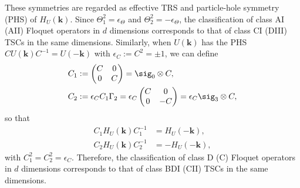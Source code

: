 \documentclass[
floatfix,
pra,
twocolumn,
reprint,
amsmath,amssymb,
aps,
footnote,
]{revtex4}
\begin{document}
These symmetries are regarded as effective TRS and particle-hole symmetry (PHS) of $H_U(\bm{k})$. Since $\Theta_1^2=\epsilon_\Theta$ and $\Theta_2^2=-\epsilon_\Theta$, the classification of class AI (AII) Floquet operators in $d$ dimensions corresponds to that of class CI (DIII) TSCs in the same dimensions. Similarly, when $U(\bm{k})$ has the PHS $CU(\bm{k})C^{-1}=U(-\bm{k})$ with $\epsilon_C:=C^2=\pm 1$, we can define
\begin{align}
C_1 &:=
\begin{pmatrix}
C & 0\\
0 & C
\end{pmatrix}
 = \sig_0 \otimes C
, \\
C_2 &:= \epsilon_C C_1\Gamma_2=\epsilon_C
\begin{pmatrix}
C & 0\\
0 & -C
\end{pmatrix}
 = \epsilon_C \sig_3 \otimes C
,
\end{align}
so that
\begin{align}
C_1H_U(\bm{k})C_1^{-1} &= H_U(-\bm{k})
, \label{HU2_C1} \\
C_2H_U(\bm{k})C_2^{-1} &= -H_U(-\bm{k}),\label{HU2_C2}
\end{align}
with $C_1^2=C_2^2=\epsilon_C$. Therefore, the classification of class D (C) Floquet operators in $d$ dimensions corresponds to that of class BDI (CII) TSCs in the same dimensions.
\end{document}

